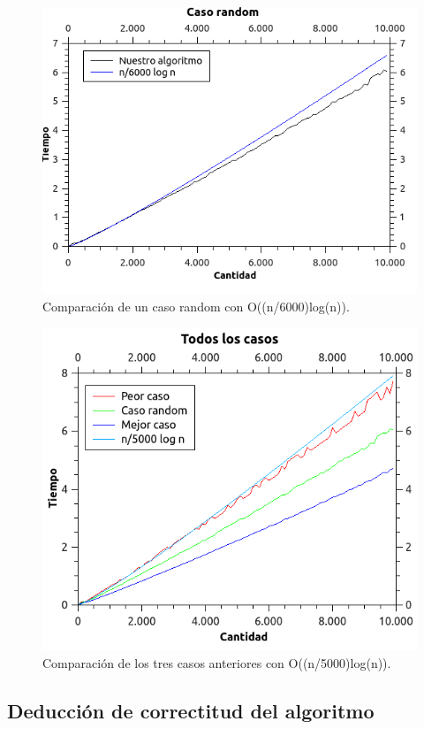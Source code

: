 \begin{figure}[H]
\begin{center}

  \includegraphics[width=\linewidth]{../graficos/ej2/Random.png}
  \caption{{\small Comparación de un caso random con O((n/6000)log(n)).}} \label{ej2-random-caso}
\endminipage

\end{center}
\end{figure}

\begin{figure}[H]
\begin{center}

  \includegraphics[width=\linewidth]{../graficos/ej2/Todos.png}
  \caption{{\small Comparación de los tres casos anteriores con O((n/5000)log(n)).}} \label{ej2-todos-casos}
\endminipage

\end{center}
\end{figure}

\subsection{Deducción de correctitud del algoritmo}
